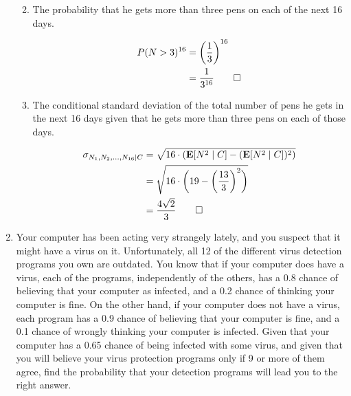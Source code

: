 \documentclass[paper=usletter, fontsize=12pt]{article}
\begin{document}
\begin{enumerate}
\begin{enumerate}
\begin{cproof}
            \end{cproof}

            \item The probability that he gets more than three pens on each of
            the next 16 days.
            \begin{cproof}
                \begin{align*}
                    P(N > 3)^{16} & = \bigg(\frac{1}{3}\bigg)^{16}\\
                    & = \frac{1}{3^{16}} \qedhere
                \end{align*}
                \endgroup
            \end{cproof}

            \item The conditional standard deviation of the total number of
            pens he gets in the next 16 days given that he gets more than three
            pens on each of those days.
            \begin{cproof}

                \begin{align*}
                    \sigma_{N_1,N_2,\ldots,N_{16} \mid C} &= \sqrt{16\cdot(\textbf{E}[N^2 \mid C]-(\textbf{E}[N^2 \mid C])^2)} \\
                    & = \sqrt{16\cdot\bigg(19-\bigg(\frac{13}{3}\bigg)^2\bigg)}\\
                    & = \frac{4\sqrt{2}}{3} \qedhere
                \end{align*}
                \endgroup

            \end{cproof}

        \end{enumerate}

        \item Your computer has been acting very strangely lately, and you
        suspect that it might have a virus on it. Unfortunately, all 12 of the
        different virus detection programs you own are outdated. You know that
        if your computer does have a virus, each of the programs, independently
        of the others, has a 0.8 chance of believing that your computer as
        infected, and a 0.2 chance of thinking your computer is fine. On the
        other hand, if your computer does not have a virus, each program has a
        0.9 chance of believing that your computer is fine, and a 0.1 chance of
        wrongly thinking your computer is infected. Given that your computer
        has a 0.65 chance of being infected with some virus, and given that you
        will believe your virus protection programs only if 9 or more of them
        agree, find the probability that your detection programs will lead you
        to the right answer.
        \begin{cproof}


\end{cproof}
\end{enumerate}
\end{document}
